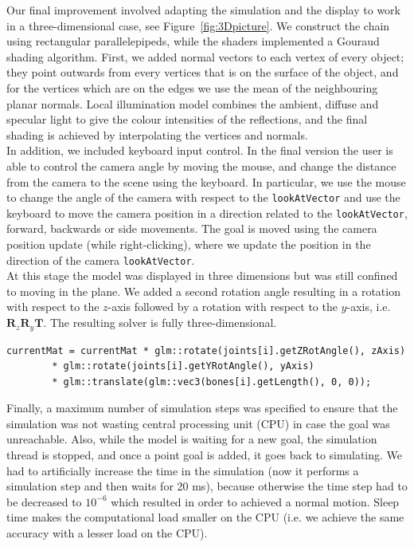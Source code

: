 \documentclass[paper=a4, fontsize=11pt]{scrartcl} %
\numberwithin{equation}{section} %
\numberwithin{figure}{section} %
\numberwithin{table}{section} %
\begin{document}
Our final improvement involved adapting the simulation and the display to work in a three-dimensional case, see Figure~\ref{fig:3Dpicture}. We construct the chain using rectangular parallelepipeds, while the shaders implemented a Gouraud shading algorithm. First, we added normal vectors to each vertex of every object; they point outwards from every vertices that is on the surface of the object, and for the vertices which are on the edges we use the mean of the neighbouring planar normals. Local illumination model combines the ambient, diffuse and specular light to give the colour intensities of the reflections, and the final shading is achieved by interpolating the vertices and normals. \\

In addition, we included keyboard input control. In the final version the user is able to control the camera angle by moving the mouse, and change the distance from the camera to the scene using the keyboard. In particular, we use the mouse to change the angle of the camera with respect to the \texttt{lookAtVector} and use the keyboard to move the camera position in a direction related to the \texttt{lookAtVector}, forward, backwards or side movements. The goal is moved using the camera position update (while right-clicking), where we update the position in the direction of the camera \texttt{lookAtVector}.\\

At this stage the model was displayed in three dimensions but was still confined to moving in the plane. We added a second rotation angle resulting in a rotation with respect to the \(z\)-axis followed by a rotation with respect to the \(y\)-axis, i.e. \( \mathbf{R}_z \mathbf{R}_y \mathbf{T}\). The resulting solver is fully three-dimensional. \\


\begin{lstlisting}[float,caption=Update total transformation with current joint rotation and translation., label={lst:transformation}]
currentMat = currentMat * glm::rotate(joints[i].getZRotAngle(), zAxis)
		* glm::rotate(joints[i].getYRotAngle(), yAxis)
		* glm::translate(glm::vec3(bones[i].getLength(), 0, 0));
\end{lstlisting}


Finally, a maximum number of simulation steps was specified to ensure that the simulation was not wasting central processing unit (CPU) in case the goal was unreachable. Also, while the model is waiting for a new goal, the simulation thread is stopped, and once a point goal is added, it goes back to simulating. We had to artificially increase the time in the simulation (now it performs a simulation step and then waits for 20 ms), because otherwise the time step had to be decreased to \(10^{-6}\) which resulted in order to achieved a normal motion. Sleep time makes the computational load smaller on the CPU (i.e. we achieve the same accuracy with a lesser load on the CPU). 
  
\end{document}
